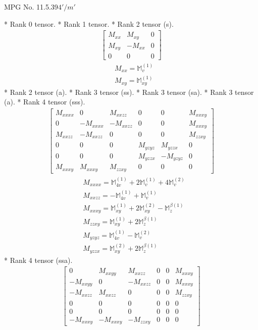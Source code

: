 \documentclass[fleqn,8pt,landscape]{jsarticle}
\begin{document}
\setcounter{MaxMatrixCols}{32}

\renewcommand{\tablename}{Table~}
\renewcommand{\figurename}{Figure~}
\begin{center}
\LARGE
MPG No. 11.5.39\quad$4'/m'$
\end{center}
* Rank 0 tensor.
* Rank 1 tensor.
* Rank 2 tensor (s).
\begin{align*}
\begin{bmatrix} M_{xx} & M_{xy} & 0 \\ M_{xy} & - M_{xx} & 0 \\ 0 & 0 & 0 \end{bmatrix}
\end{align*}
\begin{align*}
& M_{xx} = \mathbb{M}_{v}^{(1)} \\
& M_{xy} = \mathbb{M}_{xy}^{(1)}
\end{align*}
* Rank 2 tensor (a).
* Rank 3 tensor (ss).
* Rank 3 tensor (sa).
* Rank 3 tensor (a).
* Rank 4 tensor (sss).
\begin{align*}
\begin{bmatrix} M_{xxxx} & 0 & M_{xxzz} & 0 & 0 & M_{xxxy} \\ 0 & - M_{xxxx} & - M_{xxzz} & 0 & 0 & M_{xxxy} \\ M_{xxzz} & - M_{xxzz} & 0 & 0 & 0 & M_{zzxy} \\ 0 & 0 & 0 & M_{yzyz} & M_{yzzx} & 0 \\ 0 & 0 & 0 & M_{yzzx} & - M_{yzyz} & 0 \\ M_{xxxy} & M_{xxxy} & M_{zzxy} & 0 & 0 & 0 \end{bmatrix}
\end{align*}
\begin{align*}
& M_{xxxx} = \mathbb{M}_{4v}^{(1)} + 2 \mathbb{M}_{v}^{(1)} + 4 \mathbb{M}_{v}^{(2)} \\
& M_{xxzz} = - \mathbb{M}_{4v}^{(1)} + \mathbb{M}_{v}^{(1)} \\
& M_{xxxy} = \mathbb{M}_{xy}^{(1)} + 2 \mathbb{M}_{xy}^{(2)} - \mathbb{M}_{z}^{\beta(1)} \\
& M_{zzxy} = \mathbb{M}_{xy}^{(1)} + 2 \mathbb{M}_{z}^{\beta(1)} \\
& M_{yzyz} = \mathbb{M}_{4v}^{(1)} - \mathbb{M}_{v}^{(2)} \\
& M_{yzzx} = \mathbb{M}_{xy}^{(2)} + 2 \mathbb{M}_{z}^{\beta(1)}
\end{align*}
* Rank 4 tensor (ssa).
\begin{align*}
\begin{bmatrix} 0 & M_{xxyy} & M_{xxzz} & 0 & 0 & M_{xxxy} \\ - M_{xxyy} & 0 & - M_{xxzz} & 0 & 0 & M_{xxxy} \\ - M_{xxzz} & M_{xxzz} & 0 & 0 & 0 & M_{zzxy} \\ 0 & 0 & 0 & 0 & 0 & 0 \\ 0 & 0 & 0 & 0 & 0 & 0 \\ - M_{xxxy} & - M_{xxxy} & - M_{zzxy} & 0 & 0 & 0 \end{bmatrix}
\end{align*}
\end{document}
